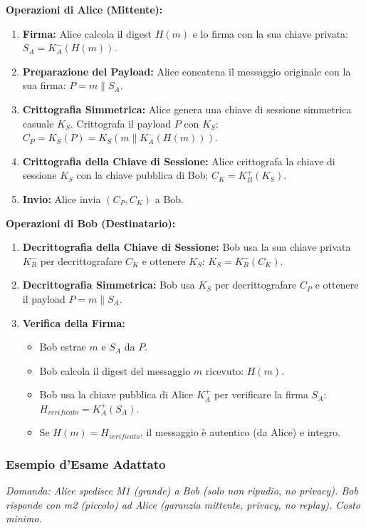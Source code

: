 \textbf{Operazioni di Alice (Mittente):}
\begin{enumerate}
    \item \textbf{Firma:} Alice calcola il digest $H(m)$ e lo firma con la sua chiave privata: $S_A = K_A^-(H(m))$.
    \item \textbf{Preparazione del Payload:} Alice concatena il messaggio originale con la sua firma: $P = m \mathbin{\|} S_A$.
    \item \textbf{Crittografia Simmetrica:} Alice genera una chiave di sessione simmetrica casuale $K_S$. Crittografa il payload $P$ con $K_S$: $C_P = K_S(P) = K_S(m \mathbin{\|} K_A^-(H(m)))$.
    \item \textbf{Crittografia della Chiave di Sessione:} Alice crittografa la chiave di sessione $K_S$ con la chiave pubblica di Bob: $C_K = K_B^+(K_S)$.
    \item \textbf{Invio:} Alice invia $(C_P, C_K)$ a Bob.
\end{enumerate}

\textbf{Operazioni di Bob (Destinatario):}
\begin{enumerate}
    \item \textbf{Decrittografia della Chiave di Sessione:} Bob usa la sua chiave privata $K_B^-$ per decrittografare $C_K$ e ottenere $K_S$: $K_S = K_B^-(C_K)$.
    \item \textbf{Decrittografia Simmetrica:} Bob usa $K_S$ per decrittografare $C_P$ e ottenere il payload $P = m \mathbin{\|} S_A$.
    \item \textbf{Verifica della Firma:}
        \begin{itemize}
            \item Bob estrae $m$ e $S_A$ da $P$.
            \item Bob calcola il digest del messaggio $m$ ricevuto: $H(m)$.
            \item Bob usa la chiave pubblica di Alice $K_A^+$ per verificare la firma $S_A$: $H_{verificato} = K_A^+(S_A)$.
            \item Se $H(m) = H_{verificato}$, il messaggio è autentico (da Alice) e integro.
        \end{itemize}
\end{enumerate}

\subsubsection{Esempio d'Esame Adattato}
\textit{Domanda: Alice spedisce M1 (grande) a Bob (solo non ripudio, no privacy). Bob risponde con m2 (piccolo) ad Alice (garanzia mittente, privacy, no replay). Costo minimo.}

